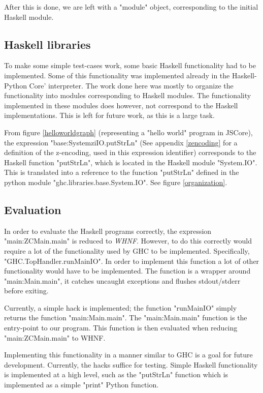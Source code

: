 After this is done, we are left with a "module" object, corresponding to the initial Haskell
module. 

\subsection{Haskell libraries}

To make some simple test-cases work, some basic Haskell functionality had to be 
implemented. Some of this functionality was implemented already in the 
Haskell-Python Core' interpreter.
The work done here was mostly to organize the functionality into modules corresponding
to Haskell modules. The functionality implemented in these modules does however, 
not correspond to the Haskell implementations. This is left for future work, as this 
is a large task.

From figure \ref{helloworldgraph} (representing a "hello world" program in JSCore), 
the expression "base:SystemziIO.putStrLn" (See appendix \ref{zencoding} for a definition of
the z-encoding, used in this expression identifier) corresponds
to the Haskell function "putStrLn", which is located in the Haskell module "System.IO". 
This is translated into a reference to the function "putStrLn" defined in the python module 
"ghc.libraries.base.System.IO". See figure \ref{organization}.

\subsection{Evaluation}
\begin{sloppypar}
In order to evaluate the Haskell programs correctly, the expression "main:ZCMain.main" 
is reduced to \emph{WHNF}. However, to do this correctly would require a lot of 
the functionality used by GHC
to be implemented. Specifically, "GHC.TopHandler.runMainIO". 
In order to implement this function
a lot of other functionality would have to be implemented. 
The function is a wrapper around 
"main:Main.main", it catches uncaught exceptions and flushes stdout/stderr 
before exiting. 
\end{sloppypar}

Currently, a simple hack is implemented; the function "runMainIO" simply returns 
the function "main:Main.main".
The "main:Main.main" function is the entry-point to our program. This function 
is then evaluated when reducing "main:ZCMain.main" to WHNF.

Implementing this functionality in a manner similar to GHC is a goal for future
development. Currently, the hacks suffice for testing.
Simple Haskell functionality is implemented at a high level, such as the
"putStrLn" function which is implemented as a simple "print" Python function.

